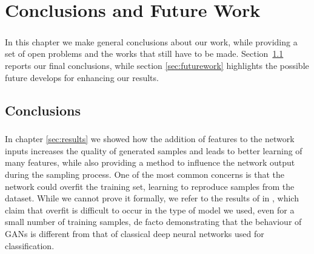 \chapter{Conclusions and Future Work}
\label{ch:conclusions}
\paragraph{} In this chapter we make general conclusions about our work, while providing a set of open problems and the works that still have to be made. Section~\ref{sec:conclusions} reports our final conclusions, while section \ref{sec:futurework} highlights the possible future develops for enhancing our results.


\section{Conclusions}
\label{sec:conclusions}

\paragraph{} In chapter \ref{sec:results} we showed how the addition of features to the network inputs increases the quality of generated samples and leads to better learning of many features, while also providing a method to influence the network output during the sampling process. One of the most common concerns is that the network could overfit the training set, learning to reproduce samples from the dataset. While we cannot prove it formally, we refer to the results of \citeauthor{empiricalevaluation} in \cite[Appendix~C]{empiricalevaluation}, which claim that overfit is difficult to occur in the type of model we used, even for a small number of training samples, de facto demonstrating that the behaviour of GANs is different from that of classical deep neural networks used for classification.


